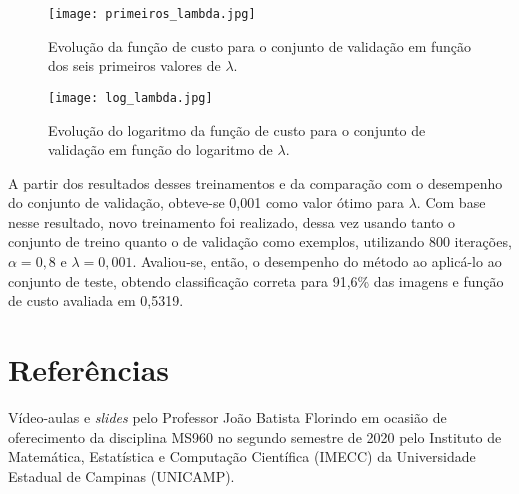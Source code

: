 \documentclass[12pt]{article}
\begin{document}
\begin{figure}
\begin{center}
\texttt{[image: primeiros\_lambda.jpg]}
\caption{Evolução da função de custo para o conjunto de validação em função dos seis primeiros valores de $\lambda$.} \label{primeiros_lambda}
\end{center}
\end{figure}

\begin{figure}
\begin{center}
\texttt{[image: log\_lambda.jpg]}
\caption{Evolução do logaritmo da função de custo para o conjunto de validação em função do logaritmo de $\lambda$.} \label{log_lambda}
\end{center}
\end{figure}

A partir dos resultados desses treinamentos e da comparação com o desempenho do conjunto de validação, obteve-se 0,001 como valor ótimo para $\lambda$. Com base nesse resultado, novo treinamento foi realizado, dessa vez usando tanto o conjunto de treino quanto o de validação como exemplos, utilizando 800 iterações, $\alpha=0,8$ e $\lambda=0,001$. Avaliou-se, então, o desempenho do método ao aplicá-lo ao conjunto de teste, obtendo classificação correta para 91,6\% das imagens e função de custo avaliada em 0,5319.


\section{Referências}
Vídeo-aulas e \textit{slides} pelo Professor João Batista Florindo em ocasião de oferecimento da disciplina MS960 no segundo semestre de 2020 pelo Instituto de Matemática, Estatística e Computação Científica (IMECC) da Universidade Estadual de Campinas (UNICAMP).
\end{document}
